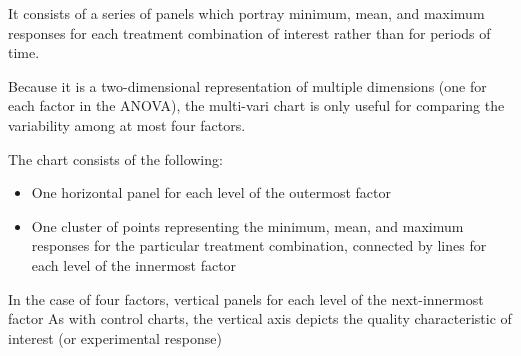 It consists of a series of panels which portray minimum, mean, and maximum responses for each treatment combination of interest rather than for periods of time.

Because it is a two-dimensional representation of multiple dimensions (one for each factor in the ANOVA), the multi-vari chart is only useful for comparing the variability among at most four factors.

The chart consists of the following:
\begin{itemize}
\item One horizontal panel for each level of the outermost factor
\item One cluster of points representing the minimum, mean, and maximum responses for the particular treatment combination, connected by lines for each level of the innermost factor
\end{itemize}
In the case of four factors, vertical panels for each level of the next-innermost factor
As with control charts, the vertical axis depicts the quality characteristic of interest (or experimental response)
